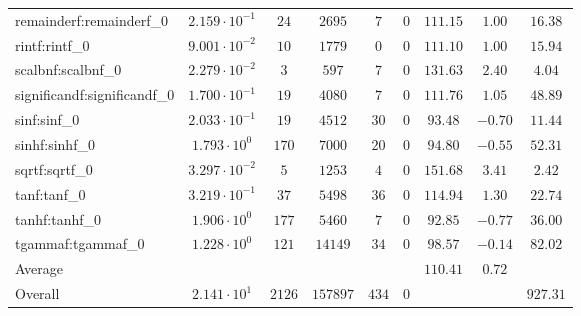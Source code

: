 \begin{tabular}{|l|c|c|c|c|c|c|c|c|}
remainderf:remainderf\_0     & $ 2.159 \cdot 10^{-1} $ & $ 24     $ & $ 2695   $ & $ 7   $ & $ 0   $ & $ 111.15      $ & $ 1.00    $ & $ 16.38   $ \\
rintf:rintf\_0               & $ 9.001 \cdot 10^{-2} $ & $ 10     $ & $ 1779   $ & $ 0   $ & $ 0   $ & $ 111.10      $ & $ 1.00    $ & $ 15.94   $ \\
scalbnf:scalbnf\_0           & $ 2.279 \cdot 10^{-2} $ & $ 3      $ & $ 597    $ & $ 7   $ & $ 0   $ & $ 131.63      $ & $ 2.40    $ & $ 4.04    $ \\
significandf:significandf\_0 & $ 1.700 \cdot 10^{-1} $ & $ 19     $ & $ 4080   $ & $ 7   $ & $ 0   $ & $ 111.76      $ & $ 1.05    $ & $ 48.89   $ \\
sinf:sinf\_0                 & $ 2.033 \cdot 10^{-1} $ & $ 19     $ & $ 4512   $ & $ 30  $ & $ 0   $ & $ 93.48       $ & $ -0.70   $ & $ 11.44   $ \\
sinhf:sinhf\_0               & $ 1.793 \cdot 10^{0}  $ & $ 170    $ & $ 7000   $ & $ 20  $ & $ 0   $ & $ 94.80       $ & $ -0.55   $ & $ 52.31   $ \\
sqrtf:sqrtf\_0               & $ 3.297 \cdot 10^{-2} $ & $ 5      $ & $ 1253   $ & $ 4   $ & $ 0   $ & $ 151.68      $ & $ 3.41    $ & $ 2.42    $ \\
tanf:tanf\_0                 & $ 3.219 \cdot 10^{-1} $ & $ 37     $ & $ 5498   $ & $ 36  $ & $ 0   $ & $ 114.94      $ & $ 1.30    $ & $ 22.74   $ \\
tanhf:tanhf\_0               & $ 1.906 \cdot 10^{0}  $ & $ 177    $ & $ 5460   $ & $ 7   $ & $ 0   $ & $ 92.85       $ & $ -0.77   $ & $ 36.00   $ \\
tgammaf:tgammaf\_0           & $ 1.228 \cdot 10^{0}  $ & $ 121    $ & $ 14149  $ & $ 34  $ & $ 0   $ & $ 98.57       $ & $ -0.14   $ & $ 82.02   $ \\
\hline
Average                      & $                     $ & $        $ & $        $ & $     $ & $     $ & $ 110.41      $ & $ 0.72    $ & $         $ \\
\hline
Overall                      & $ 2.141 \cdot 10^{1}  $ & $ 2126   $ & $ 157897 $ & $ 434 $ & $ 0   $ & $             $ & $         $ & $ 927.31  $ \\
\hline
\end{tabular}
